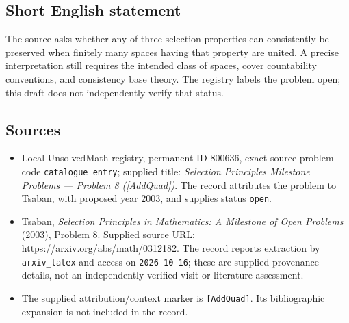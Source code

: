 \documentclass[11pt]{article}
\begin{document}
\subsection{Short English statement}
The source asks whether any of three selection properties can consistently be preserved when finitely many spaces having that property are united. A precise interpretation still requires the intended class of spaces, cover countability conventions, and consistency base theory. The registry labels the problem open; this draft does not independently verify that status.
\subsection{Sources}
\begin{itemize}
\item Local UnsolvedMath registry, permanent ID \(800636\), exact source problem code \texttt{catalogue entry}; supplied title: \emph{Selection Principles Milestone Problems --- Problem 8 ([AddQuad])}. The record attributes the problem to Tsaban, with proposed year \(2003\), and supplies status \texttt{open}.
\item Tsaban, \emph{Selection Principles in Mathematics: A Milestone of Open Problems} (2003), Problem 8. Supplied source URL: \url{https://arxiv.org/abs/math/0312182}. The record reports extraction by \texttt{arxiv\_latex} and access on \texttt{2026-10-16}; these are supplied provenance details, not an independently verified visit or literature assessment.
\item The supplied attribution/context marker is \texttt{[AddQuad]}. Its bibliographic expansion is not included in the record.
\end{itemize}
\end{document}
